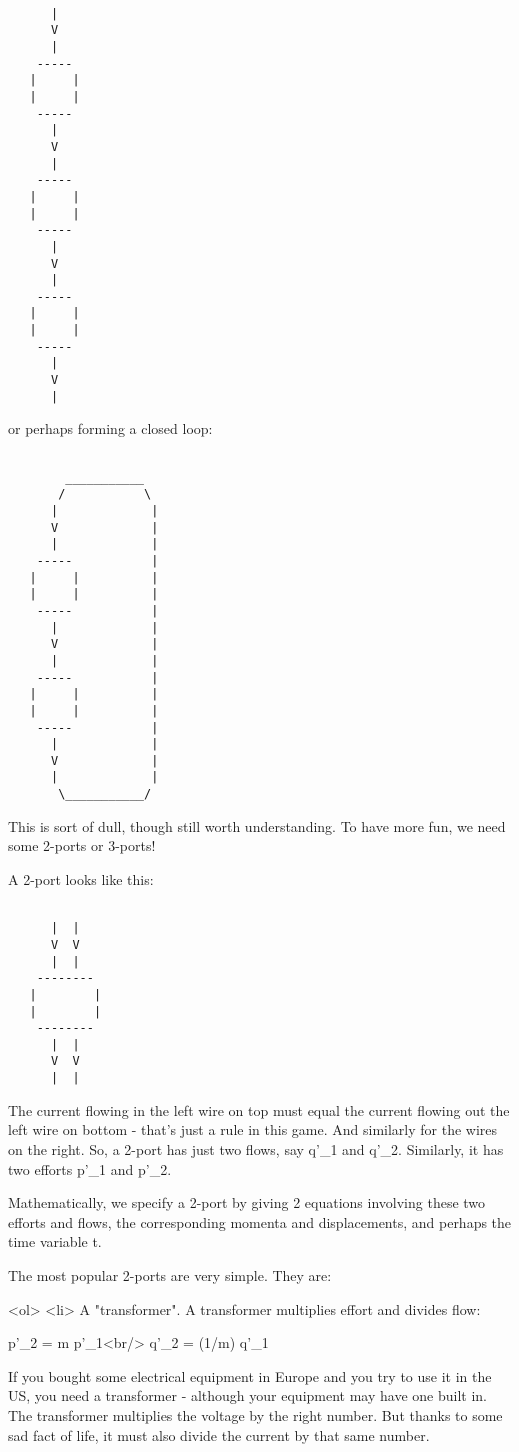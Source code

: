 \begin{verbatim}

      |
      V
      |
    -----
   |     |
   |     |
    -----
      |
      V
      |
    -----
   |     |
   |     |
    -----
      |
      V
      |
    -----
   |     |
   |     |
    -----
      |
      V
      |
\end{verbatim}
    

or perhaps forming a closed loop:


\begin{verbatim}

        ___________
       /           \
      |             |
      V             |
      |             |
    -----           |
   |     |          |
   |     |          |
    -----           |
      |             |
      V             |
      |             |
    -----           |
   |     |          |
   |     |          |
    -----           |
      |             |
      V             |
      |             |
       \___________/

\end{verbatim}
    

This is sort of dull, though still worth understanding.  To have more
fun, we need some 2-ports or 3-ports!

A 2-port looks like this:


\begin{verbatim}

      |  |
      V  V
      |  |
    --------
   |        |
   |        |
    --------
      |  |
      V  V
      |  |
\end{verbatim}
    

The current flowing in the left wire on top must equal the current
flowing out the left wire on bottom - that's just a rule in this game.
And similarly for the wires on the right.  So, a 2-port has just two
flows, say q'_{1} and q'_{2}.  Similarly, it has two
efforts p'_{1} and p'_{2}.

Mathematically, we specify a 2-port by giving 2 equations involving 
these two efforts and flows, the corresponding momenta and 
displacements, and perhaps the time variable t.

The most popular 2-ports are very simple.  They are:

<ol>
<li>
A "transformer".  A transformer multiplies effort and divides
  flow:

  p'_{2} =    m    p'_{1}<br/>
  q'_{2} = (1/m) q'_{1}

 If you bought some electrical equipment in Europe and you try to
 use it in the US, you need a transformer - although your equipment 
 may have one built in.  The transformer multiplies the voltage
 by the right number.  But thanks to some sad fact of life, it must
 also divide the current by that same number.  


